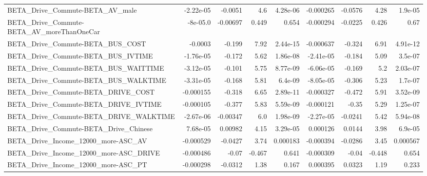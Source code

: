 \begin{tabular}{lrrrrrrrr}
BETA\_Drive\_Commute-BETA\_AV\_male                    &   -2.22e-05 &      -0.0051 &       4.6 & 4.28e-06 &  -0.000265 &     -0.0576 &         4.28 &       1.9e-05 \\
BETA\_Drive\_Commute-BETA\_AV\_moreThanOneCar          &    -8e-05.0 &     -0.00697 &     0.449 &    0.654 &  -0.000294 &     -0.0225 &        0.426 &          0.67 \\
BETA\_Drive\_Commute-BETA\_BUS\_COST                   &     -0.0003 &       -0.199 &      7.92 & 2.44e-15 &  -0.000637 &      -0.324 &         6.91 &      4.91e-12 \\
BETA\_Drive\_Commute-BETA\_BUS\_IVTIME                 &   -1.76e-05 &       -0.172 &      5.62 & 1.86e-08 &  -2.41e-05 &      -0.184 &         5.09 &       3.5e-07 \\
BETA\_Drive\_Commute-BETA\_BUS\_WAITTIME               &   -3.12e-05 &       -0.101 &      5.75 & 8.77e-09 &  -6.06e-05 &      -0.169 &          5.2 &      2.03e-07 \\
BETA\_Drive\_Commute-BETA\_BUS\_WALKTIME               &   -3.31e-05 &       -0.168 &      5.81 &  6.4e-09 &  -8.05e-05 &      -0.306 &         5.23 &       1.7e-07 \\
BETA\_Drive\_Commute-BETA\_DRIVE\_COST                 &   -0.000155 &       -0.318 &      6.65 & 2.89e-11 &  -0.000327 &      -0.472 &         5.91 &      3.52e-09 \\
BETA\_Drive\_Commute-BETA\_DRIVE\_IVTIME               &   -0.000105 &       -0.377 &      5.83 & 5.59e-09 &  -0.000121 &       -0.35 &         5.29 &      1.25e-07 \\
BETA\_Drive\_Commute-BETA\_DRIVE\_WALKTIME             &   -2.67e-06 &     -0.00347 &       6.0 & 1.98e-09 &  -2.27e-05 &     -0.0241 &         5.42 &      5.94e-08 \\
BETA\_Drive\_Commute-BETA\_Drive\_Chinese              &    7.68e-05 &      0.00982 &      4.15 & 3.29e-05 &   0.000126 &      0.0144 &         3.98 &       6.9e-05 \\
BETA\_Drive\_Income\_12000\_more-ASC\_AV                &   -0.000529 &      -0.0427 &      3.74 & 0.000183 &  -0.000394 &     -0.0286 &         3.45 &      0.000567 \\
BETA\_Drive\_Income\_12000\_more-ASC\_DRIVE             &   -0.000486 &        -0.07 &    -0.467 &    0.641 &  -0.000309 &       -0.04 &       -0.448 &         0.654 \\
BETA\_Drive\_Income\_12000\_more-ASC\_PT                &   -0.000298 &      -0.0312 &      1.38 &    0.167 &   0.000395 &      0.0323 &         1.19 &         0.233 \\

\end{tabular}
